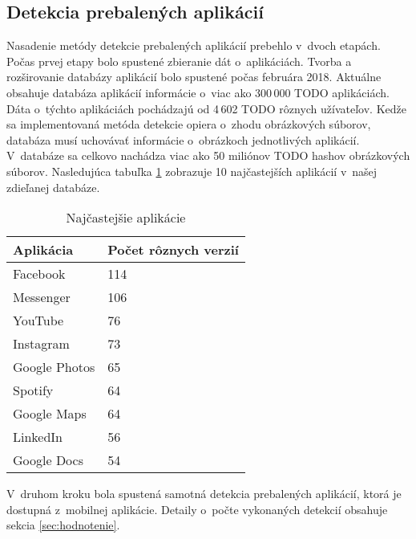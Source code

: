 \subsection{Detekcia prebalených aplikácií}
Nasadenie metódy detekcie prebalených aplikácií prebehlo v~dvoch etapách. Počas prvej etapy bolo spustené zbieranie dát o~aplikáciách. Tvorba a rozširovanie databázy aplikácií bolo spustené počas februára 2018. Aktuálne obsahuje databáza aplikácií informácie o~viac ako 300\,000 TODO aplikáciách. Dáta o~týchto aplikáciách pochádzajú od 4\,602 TODO rôznych užívateľov. Kedže sa implementovaná metóda detekcie opiera o~zhodu obrázkových súborov, databáza musí uchovávať informácie o~obrázkoch jednotlivých aplikácií. V~databáze sa celkovo nachádza viac ako 50 miliónov TODO hashov obrázkových súborov.
Nasledujúca tabuľka \ref{apps-common} zobrazuje 10 najčastejších aplikácií v~našej zdieľanej databáze.

\begin{table}[]
\centering
\begin{tabular}{|l|l|}
\hline
Aplikácia     & Počet rôznych verzií \\ \hline
Facebook      & 114                  \\
Messenger     & 106                  \\
YouTube       & 76                   \\
Instagram     & 73                   \\
Google Photos & 65                   \\
Spotify       & 64                   \\
Google Maps   & 64                   \\
LinkedIn      & 56                   \\
Google Docs   & 54                   \\ \hline
\end{tabular}
\caption{Najčastejšie aplikácie}
\label{apps-common}
\end{table}

V~druhom kroku bola spustená samotná detekcia prebalených aplikácií, ktorá je dostupná z~mobilnej aplikácie. Detaily o~počte vykonaných detekcií obsahuje sekcia \ref{sec:hodnotenie}.
